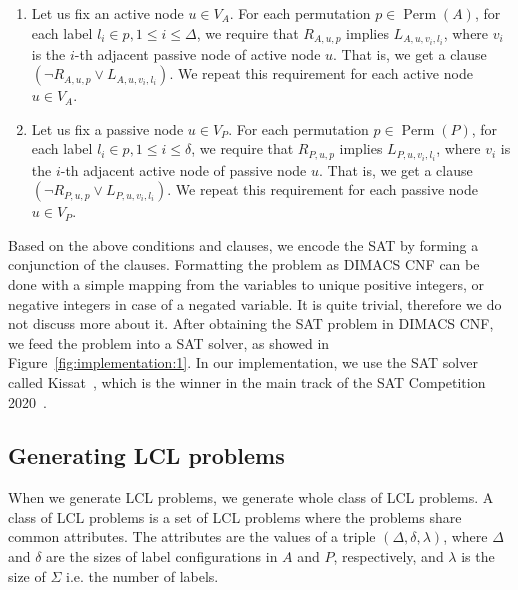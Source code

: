 \begin{enumerate}
\begin{enumerate}
  \item
    Let us fix an active node $u \in V_A$.
    For each permutation $p \in \operatorname{Perm}(A)$, for each label $l_i \in p, 1 \leq i \leq \Delta$, we require that $R_{A, u, p}$ implies $L_{A,u,v_i,l_i}$, where $v_i$ is the $i$-th adjacent passive node of active node $u$.
    That is, we get a clause $(\neg R_{A, u, p} \lor L_{A,u,v_i,l_i})$.
    We repeat this requirement for each active node $u \in V_A$.
    \label{enu:sat_conditions:3a}
  \item
    Let us fix a passive node $u \in V_P$.
    For each permutation $p \in \operatorname{Perm}(P)$, for each label $l_i \in p, 1 \leq i \leq \delta$, we require that $R_{P, u, p}$ implies $L_{P,u,v_i,l_i}$, where $v_i$ is the $i$-th adjacent active node of passive node $u$.
    That is, we get a clause $(\neg R_{P, u, p} \lor L_{P,u,v_i,l_i})$.
    We repeat this requirement for each passive node $u \in V_P$.
    \label{enu:sat_conditions:3b}
  \end{enumerate}
\end{enumerate}

Based on the above conditions and clauses, we encode the SAT by forming a conjunction of the clauses.
Formatting the problem as DIMACS CNF can be done with a simple mapping from the variables to unique positive integers, or negative integers in case of a negated variable.
It is quite trivial, therefore we do not discuss more about it.
After obtaining the SAT problem in DIMACS CNF, we feed the problem into a SAT solver, as showed in Figure~\ref{fig:implementation:1}.
In our implementation, we use the SAT solver called Kissat~\cite{BiereFazekasFleuryHeisinger-SAT-Competition-2020-solvers, Kissat}, which is the winner in the main track of the SAT Competition 2020~\cite{SatCompetition2020}.


\subsection{Generating LCL problems} \label{sec:implementation:generating_lcl_problems}

When we generate LCL problems, we generate whole class of LCL problems.
A class of LCL problems is a set of LCL problems where the problems share common attributes.
The attributes are the values of a triple $(\Delta, \delta, \lambda)$, where $\Delta$ and $\delta$ are the sizes of label configurations in $A$ and $P$, respectively, and $\lambda$ is the size of $\Sigma$ i.e. the number of labels.

